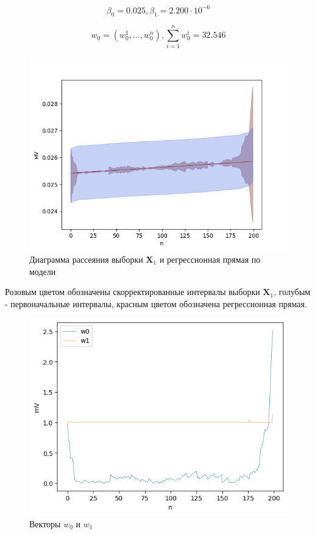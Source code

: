 \begin{equation*}
	\beta_0 = 0.025, \beta_1 = 2.200 \cdot 10 ^ {-6} 
\end{equation*}

\begin{equation*}
	w_0 = (w^{1}_0, \ldots, w^{n}_0), \sum\limits_{i=1}^{n} w^{i}_0 = 32.546
\end{equation*}

\begin{figure}[H]
	\begin{center}
		\includegraphics[scale = 0.55]{diagram_and_regress_0.png}
	\end{center}
	\caption{Диаграмма рассеяния выборки $\bm{X}_1$ и регрессионная прямая по модели}
\end{figure}

Розовым цветом обозначены скорректированные интервалы выборки $\bm{X}_1$, голубым - первоначальные интервалы, красным цветом обозначена регрессионная прямая. 

\begin{figure}[H]
	\begin{center}
		\includegraphics[scale = 0.55]{w0_w1.png}
	\end{center}
	\caption{Векторы $w_0$ и $w_1$}
\end{figure}

